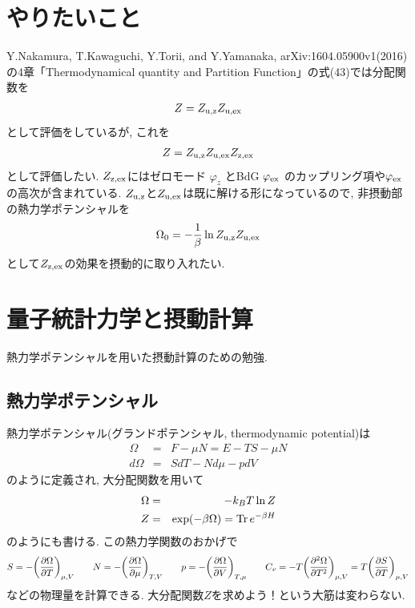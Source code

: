 \documentclass[10.5pt,a4paper]{jreport}
\newcommand{\ul}[1]{\underline{#1}}
\begin{document}
\section{やりたいこと}
Y.Nakamura, T.Kawaguchi, Y.Torii, and Y.Yamanaka, arXiv:1604.05900v1(2016)の4章「Thermodynamical quantity and Partition Function」の式(43)では分配関数を
\begin{eqnarray}
  Z = Z_{\rm u, z}Z_{\rm u,ex}
\end{eqnarray}
として評価をしているが, これを
\begin{eqnarray}
  Z = Z_{\rm u, z}Z_{\rm u,ex}Z_{\rm z, ex}
\end{eqnarray}
として評価したい. $Z_{\rm z, ex}$にはゼロモード $\varphi_{z}$ とBdG $\varphi_{\rm ex}$ のカップリング項や$\varphi_{\rm ex}$の高次が含まれている. $Z_{\rm u, z}$と$Z_{\rm u,ex}$は既に解ける形になっているので, 非摂動部の熱力学ポテンシャルを
\begin{eqnarray}
  \Omega_0 = -\frac{1}{\beta}\ln Z_{\rm u, z}Z_{\rm u,ex}
\end{eqnarray}
として$Z_{\rm z, ex}$の効果を摂動的に取り入れたい.

\section{量子統計力学と摂動計算}
熱力学ポテンシャルを用いた摂動計算のための勉強.
\subsection{熱力学ポテンシャル}
熱力学ポテンシャル(グランドポテンシャル, thermodynamic potential)は
\begin{eqnarray}
  \Omega &=& F - \mu N = E - TS -\mu N\\
  d\Omega &=& SdT - Nd\mu -pdV
\end{eqnarray}
のように定義され, 大分配関数を用いて
\begin{eqnarray}
  \Omega &=& -k_BT\ln Z\\
  Z &=& \exp(-\beta\Omega) = \Tr e^{-\beta H}
\end{eqnarray}
のようにも書ける. この熱力学関数のおかげで
\begin{eqnarray}
  S = -\qty(\frac{\partial\Omega}{\partial T})_{\mu, V}\hspace{0.7cm}N = -\qty(\frac{\partial\Omega}{\partial \mu})_{T, V}\hspace{0.7cm}p = -\qty(\frac{\partial\Omega}{\partial V})_{T, \mu}\hspace{0.7cm}C_v = -T\qty(\frac{\partial^2\Omega}{\partial T^2})_{\mu, V} = T\qty(\frac{\partial S}{\partial T})_{\mu, V}
\end{eqnarray}
などの物理量を計算できる. 大分配関数$Z$を求めよう！という大筋は変わらない.
\end{document}
